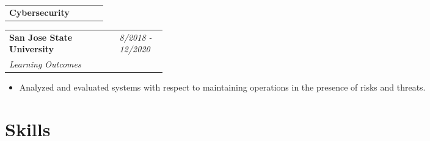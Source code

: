 \documentclass[11pt]{article} %
\begin{document}
\begin{paracol}{2}



\begin{supertabular}{p{.78\linewidth}p{0.3\linewidth}}
   \Large\textbf{Cybersecurity} \raggedright & \textit{} \\ 
\end{supertabular}
\begin{supertabular}{p{.65\linewidth}p{0.3\linewidth}}
   \textbf{San Jose State University} \raggedright & \textit{8/2018 - 12/2020} \\

   \textit{Learning Outcomes} \\
\end{supertabular}
\begin{itemize}
	\setlength\itemsep{-0.5em}
    \item Analyzed and evaluated systems with respect to maintaining operations in the presence of risks and threats.
\end{itemize}



\section{Skills} 


\end{paracol}
\end{document}
